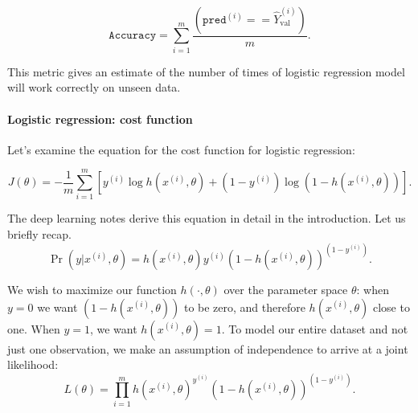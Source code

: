 \documentclass[12pt]{article}
\begin{document}
\begin{equation*}
\texttt{Accuracy} = \sum_{i=1}^m \frac{\left(\texttt{pred}^{(i)} == \hat Y_{\textrm{val}}^{(i)}\right)}{m}.
\end{equation*}

This metric gives an estimate of the number of times of logistic regression model will work correctly on unseen data.

\paragraph{Logistic regression: cost function} Let's examine the equation for the cost function for logistic regression:

\begin{equation}
  \label{eq: crossentropyloss}
  J(\theta) = -\frac{1}{m} \sum_{i=1}^{m} \left[ y^{(i)} \log h(x^{(i)}, \theta) + (1 - y^{(i)}) \log \left(1 - h(x^{(i)}, \theta)\right)\right].
\end{equation}

The deep learning notes derive this equation in detail in the introduction. Let us briefly recap.
\[
  \Pr(y | x^{(i)}, \theta) = h(x^{(i)}, \theta)y^{(i)}\left(1 - h(x^{(i)}, \theta)\right)^{(1-y^{(i)})}.
\]

We wish to maximize our function $h(\cdot, \theta)$ over the parameter space $\theta$: when $y=0$ we want $(1 - h(x^{(i)}, \theta))$ to be zero, and therefore $h(x^{(i)}, \theta)$ close to one. When $y=1$, we want $h(x^{(i)},\theta) = 1$. To model our entire dataset and not just one observation, we make an assumption of independence to arrive at a joint likelihood:
\[
  L(\theta) = \prod_{i=1}^m h(x^{(i)}, \theta)^{y^{(i)}} \left(1 - h(x^{(i)}, \theta)\right)^{(1 - y^{(i)})}.
\]
\end{document}
